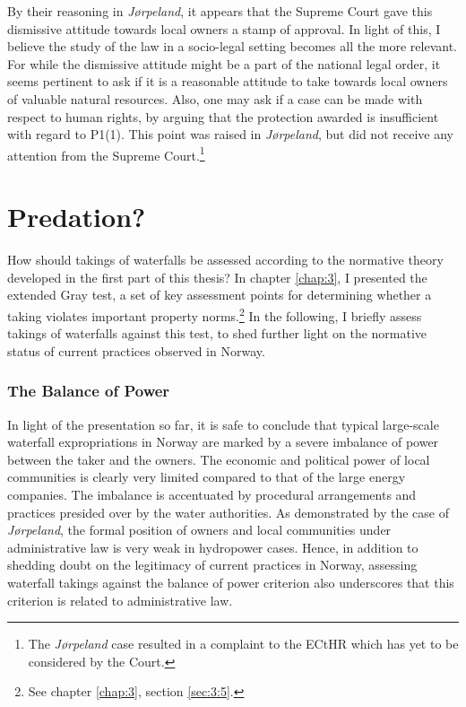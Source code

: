 {By their reasoning in \emph{Jørpeland}, it appears that the Supreme Court gave this dismissive attitude towards local owners a stamp of approval. In light of this, I believe the study of the law in a socio-legal setting becomes all the more relevant. For while the dismissive attitude might be a part of the national legal order, it seems pertinent to ask if it is a reasonable attitude to take towards local owners of valuable natural resources. Also, one may ask if a case can be made with respect to human rights, by arguing that the protection awarded is insufficient with regard to P1(1). This point was raised in \emph{Jørpeland}, but did not receive any attention from the Supreme Court.\footnote{The {\it Jørpeland} case resulted in a complaint to the ECtHR which has yet to be considered by the Court.}
}

\section{Predation?}\label{sec:5:7}

How should takings of waterfalls be assessed according to the normative theory developed in the first part of this thesis? In chapter \ref{chap:3}, I presented the extended Gray test, a set of key assessment points for determining whether a taking violates important property norms.\footnote{See chapter \ref{chap:3}, section \ref{sec:3:5}.} In the following, I briefly assess takings of waterfalls against this test, to shed further light on the normative status of current practices observed in Norway.

\subsubsection{The Balance of Power}\label{sec:5:7:1}

In light of the presentation so far, it is safe to conclude that typical large-scale waterfall expropriations in Norway are marked by a severe imbalance of power between the taker and the owners. The economic and political power of local communities is clearly very limited compared to that of the large energy companies. The imbalance is accentuated by procedural arrangements and practices presided over by the water authorities. As demonstrated by the case of {\it Jørpeland}, the formal position of owners and local communities under administrative law is very weak in hydropower cases. Hence, in addition to shedding doubt on the legitimacy of current practices in Norway, assessing waterfall takings against the balance of power criterion also underscores that this criterion is related to administrative law.

